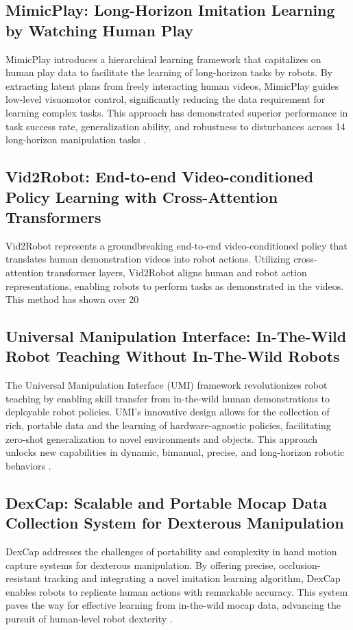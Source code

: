 \documentclass[a4paper]{article}
\begin{document}
\subsection{MimicPlay: Long-Horizon Imitation Learning by Watching Human Play}
MimicPlay introduces a hierarchical learning framework that capitalizes on human play data to facilitate the learning of long-horizon tasks by robots. By extracting latent plans from freely interacting human videos, MimicPlay guides low-level visuomotor control, significantly reducing the data requirement for learning complex tasks. This approach has demonstrated superior performance in task success rate, generalization ability, and robustness to disturbances across 14 long-horizon manipulation tasks \cite{wang2023mimicplay}.

\subsection{Vid2Robot: End-to-end Video-conditioned Policy Learning with Cross-Attention Transformers}
Vid2Robot represents a groundbreaking end-to-end video-conditioned policy that translates human demonstration videos into robot actions. Utilizing cross-attention transformer layers, Vid2Robot aligns human and robot action representations, enabling robots to perform tasks as demonstrated in the videos. This method has shown over 20%

\subsection{Universal Manipulation Interface: In-The-Wild Robot Teaching Without In-The-Wild Robots}
The Universal Manipulation Interface (UMI) framework revolutionizes robot teaching by enabling skill transfer from in-the-wild human demonstrations to deployable robot policies. UMI's innovative design allows for the collection of rich, portable data and the learning of hardware-agnostic policies, facilitating zero-shot generalization to novel environments and objects. This approach unlocks new capabilities in dynamic, bimanual, precise, and long-horizon robotic behaviors \cite{chi2024universal}.

\subsection{DexCap: Scalable and Portable Mocap Data Collection System for Dexterous Manipulation}
DexCap addresses the challenges of portability and complexity in hand motion capture systems for dexterous manipulation. By offering precise, occlusion-resistant tracking and integrating a novel imitation learning algorithm, DexCap enables robots to replicate human actions with remarkable accuracy. This system paves the way for effective learning from in-the-wild mocap data, advancing the pursuit of human-level robot dexterity \cite{wang2024dexcap}.
\end{document}
